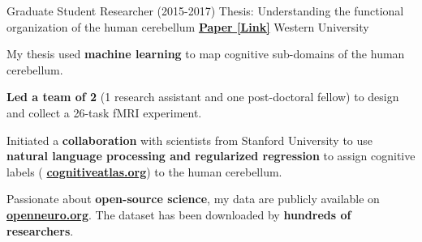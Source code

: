 \begin{cventries}
  \cventry
    {Graduate Student Researcher (2015-2017)} %
    {Thesis: Understanding the functional organization of the human cerebellum}
    {\href{http://ivrylab.berkeley.edu/uploads/4/1/1/5/41152143/functional_boundaries_in_the_human_cerebellum.pdf}{\textbf{Paper [Link]}}}
    {Western University} %
    {
      \begin{cvitems} %
        \item {My thesis used \textbf{machine learning} to map cognitive sub-domains of the human cerebellum.}
      	\item {\textbf{Led a team of 2} (1 research assistant and one post-doctoral fellow) to design and collect a 26-task fMRI experiment.}
      	\item {Initiated a \textbf{collaboration} with scientists from Stanford University to use \textbf{natural language processing and regularized regression} to assign cognitive labels ( {\href{https://cognitiveatlas.org/}{\textbf{cognitiveatlas.org}}}) to the human cerebellum.}
      	\item {Passionate about \textbf{open-source science}, my data are publicly available on {\href{https://openneuro.org/datasets/ds002105/versions/1.1.0}{\textbf{openneuro.org}}}. The dataset has been downloaded by \textbf{hundreds of researchers}.}
      \end{cvitems}
    }

\end{cventries}
